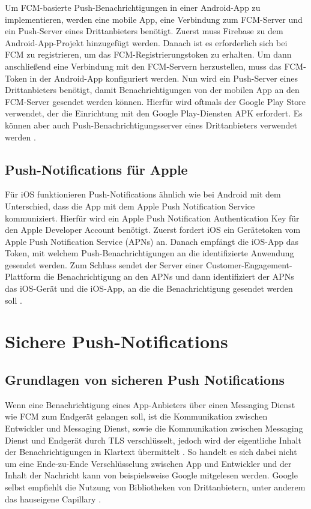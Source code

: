 \documentclass[sigconf]{acmart}
\begin{document}
Um FCM-basierte Push-Benachrichtigungen in einer 
Android-App zu implementieren, werden eine mobile App, eine Verbindung 
zum FCM-Server und ein Push-Server eines Drittanbieters benötigt.
Zuerst muss Firebase zu dem Android-App-Projekt hinzugefügt werden. 
Danach ist es erforderlich sich bei FCM zu registrieren, um das 
FCM-Registrierungstoken zu erhalten. Um dann anschließend eine 
Verbindung mit den FCM-Servern herzustellen, muss das FCM-Token 
in der Android-App konfiguriert werden. Nun wird ein Push-Server 
eines Drittanbieters benötigt, damit Benachrichtigungen von der 
mobilen App an den FCM-Server gesendet werden können.
Hierfür wird oftmals der Google Play Store verwendet, der die 
Einrichtung mit den Google Play-Diensten APK erfordert. Es können 
aber auch Push-Benachrichtigungsserver eines Drittanbieters verwendet 
werden \cite{firebase}.

\subsection{Push-Notifications für Apple}

Für iOS funktionieren Push-Notifications ähnlich wie bei Android 
mit dem Unterschied, dass die App mit dem Apple Push Notification 
Service kommuniziert. Hierfür wird ein Apple Push Notification 
Authentication Key für den Apple Developer Account benötigt. 
Zuerst fordert iOS ein Gerätetoken vom Apple Push Notification 
Service (APNs) an. Danach empfängt die iOS-App das Token, mit 
welchem Push-Benachrichtigungen an die identifizierte Anwendung 
gesendet werden. Zum Schluss sendet der Server einer 
Customer-Engagement-Plattform die Benachrichtigung an den APNs 
und dann identifiziert der APNs das iOS-Gerät und die iOS-App, 
an die die Benachrichtigung gesendet werden soll \cite{apple}.

\section{Sichere Push-Notifications}

\subsection{Grundlagen von sicheren Push Notifications}

Wenn eine Benachrichtigung eines App-Anbieters über einen Messaging 
Dienst wie FCM zum Endgerät gelangen soll, ist die Kommunikation 
zwischen Entwickler und Messaging Dienst, sowie die Kommunikation 
zwischen Messaging Dienst und Endgerät durch TLS verschlüsselt, 
jedoch wird der eigentliche Inhalt der Benachrichtigungen in Klartext 
übermittelt \cite{capillary}. So handelt es sich dabei nicht um eine 
Ende-zu-Ende Verschlüsselung zwischen App und Entwickler und der Inhalt der Nachricht kann von 
beispielsweise Google mitgelesen werden.
Google selbst empfiehlt die Nutzung von Bibliotheken von Drittanbietern, 
unter anderem das hauseigene Capillary \cite{firebase2}.
\end{document}
